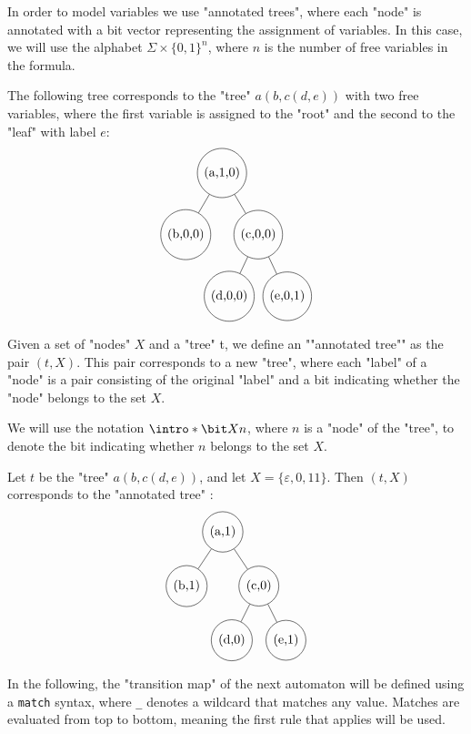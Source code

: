 \documentclass[a4paper,UKenglish,cleveref, autoref, thm-restate]{lipics-v2021}
\begin{document}
In order to model variables we use "annotated trees", where each "node" is annotated with a bit vector representing the assignment of variables.
In this case, we will use the alphabet $\Sigma \times \{0,1\}^n$, where $n$ is the number of free variables in the formula.

\begin{example}
	The following tree corresponds to the "tree" $a(b,c(d,e))$ with two free variables, where the first variable is assigned to the "root" and the second to the "leaf"
	with label $e$:
	\[
		\begin{tikzpicture}[level distance=1.7cm,
				every node/.style={draw, circle, minimum size=5mm},
				level 1/.style={sibling distance=2cm},
				level 2/.style={sibling distance=1.6cm}]
			\node {(a,1,0)}
			child { node {(b,0,0)}}
			child { node {(c,0,0)}
					child {node {(d,0,0)}}
					child {node {(e,0,1)}} };
		\end{tikzpicture}
	\]

\end{example}

\begin{definition}
	Given a set of "nodes" $X$ and a "tree" t, we define an ""annotated tree"" as the pair $(t, X)$. This pair
	corresponds to a new "tree", where each "label" of a "node" is a pair consisting of the original "label" and a bit indicating whether the "node" belongs to the set $X$.

	We will use the notation $\intro*\bit X n $, where $n$ is a "node" of the "tree", to denote the bit indicating whether $n$ belongs to the set $X$.
\end{definition}

\begin{example}
	Let $t$ be the "tree" $a(b,c(d,e))$, and let $X = \{\varepsilon,0,11\}$.
	Then $(t, X)$ corresponds to the "annotated tree" :
	\[
		\begin{tikzpicture}[level distance=1.5cm,
				every node/.style={draw, circle, minimum size=5mm},
				level 1/.style={sibling distance=2cm},
				level 2/.style={sibling distance=1.5cm}]
			\node {(a,1)}
			child { node {(b,1)}}
			child { node {(c,0)}
					child {node {(d,0)}}
					child {node {(e,1)}} };
		\end{tikzpicture}
	\]
\end{example}


In the following, the "transition map" of the next automaton will be defined using a \texttt{match} syntax, where \texttt{\_}
denotes a wildcard that matches any value. Matches are evaluated from top to bottom, meaning the first rule that applies will be used.
\end{document}
